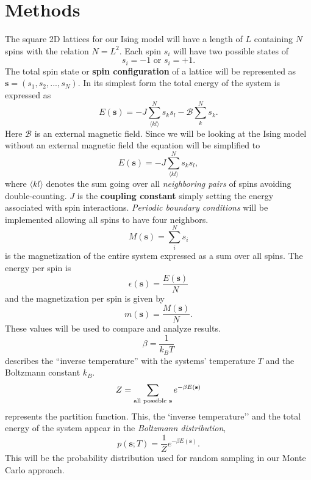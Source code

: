 \documentclass[english,notitlepage,reprint,nofootinbib]{revtex4-1}  %
\begin{document}
\section{Methods}\label{sec:methods}
The square 2D lattices for our Ising model will have a length of $L$ containing $N$ spins with the relation $N = L^2$. Each spin $s_i$ will have two possible states of 
\begin{equation*}
    s_i = -1 \text{ or } s_i = +1.
\end{equation*}
The total spin state or \textbf{spin configuration} of a lattice will be represented as $\textbf{s} = (s_1, s_2, ..., s_N)$. In its simplest form the total energy of the system is expressed as
\begin{equation*}
    E(\textbf{s}) = - J \sum^N_{\langle kl \rangle} s_k s_l - \mathscr{B} \sum^N_{k} s_k.
\end{equation*}
Here $\mathscr{B}$ is an external magnetic field. Since we will be looking at the Ising model without an external magnetic field the equation will be simplified to
\begin{equation}
    E(\textbf{s}) = - J \sum^N_{\langle kl \rangle} s_k s_l,
\end{equation}
where $\langle kl \rangle$ denotes the sum going over all \textit{neighboring pairs} of spins avoiding double-counting. $J$ is the \textbf{coupling constant} simply setting the energy associated with spin interactions. \textit{Periodic boundary conditions} will be implemented allowing all spins to have four neighbors.
\begin{equation}
    M(\textbf{s}) = \sum^N_i s_i
\end{equation}
is the magnetization of the entire system expressed as a sum over all spins. The energy per spin is
\begin{equation}
    \epsilon(\textbf{s}) = \frac{E(\textbf{s})}{N} \label{eq:mean_E}
\end{equation}
and the magnetization per spin is given by
\begin{equation}
    m(\textbf{s}) = \frac{M(\textbf{s})}{N}. \label{eq:mean_M}
\end{equation}
These values will be used to compare and analyze results.
\begin{equation}
    \beta = \frac{1}{k_B T}
\end{equation}
describes the ``inverse temperature'' with the systems' temperature $T$ and the Boltzmann constant $k_B$.
\begin{equation}
    Z = \sum_{\text{all possible \textbf{s}}} e^{- \beta E(\textbf{s})}
\end{equation}
represents the partition function. This, the `inverse temperature'' and the total energy of the system appear in the \textit{Boltzmann distribution},
\begin{equation}
    p(\textbf{s};T) = \frac{1}{Z} e^{-\beta E(\textbf{s})}.\label{eq:prob_dist}
\end{equation}
This will be the probability distribution used for random sampling in our Monte Carlo approach. 
\end{document}
